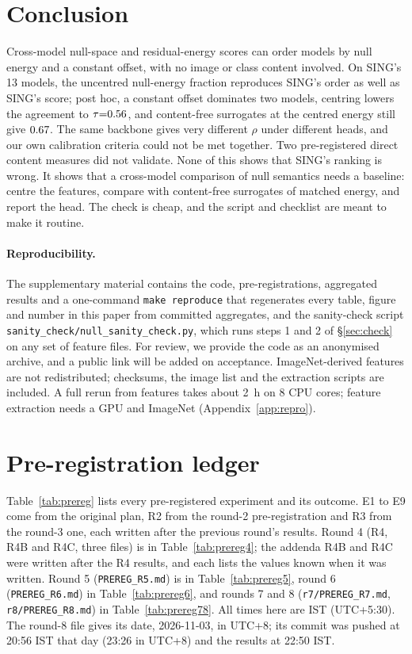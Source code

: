 \documentclass[10pt]{article}
\begin{document}
\section{Conclusion}
\label{sec:concl}
Cross-model null-space and residual-energy scores can order models by null energy and a constant offset, with no image or class content involved. On SING's 13 models, the uncentred null-energy fraction reproduces SING's order as well as SING's score; post hoc, a constant offset dominates two models, centring lowers the agreement to $\tau{=}0.56$, and content-free surrogates at the centred energy still give $0.67$. The same backbone gives very different $\rho$ under different heads, and our own calibration criteria could not be met together. Two pre-registered direct content measures did not validate. None of this shows that SING's ranking is wrong. It shows that a cross-model comparison of null semantics needs a baseline: centre the features, compare with content-free surrogates of matched energy, and report the head. The check is cheap, and the script and checklist are meant to make it routine.

\paragraph{Reproducibility.}
The supplementary material contains the code, pre-registrations, aggregated results and a one-command \texttt{make reproduce} that regenerates every table, figure and number in this paper from committed aggregates, and the sanity-check script \texttt{sanity\_check/null\_sanity\_check.py}, which runs steps 1 and 2 of \S\ref{sec:check} on any set of feature files. For review, we provide the code as an anonymised archive, and a public link will be added on acceptance.
ImageNet-derived features are not redistributed; checksums, the image list and the extraction scripts are included.
A full rerun from features takes about 2~h on 8 CPU cores; feature extraction needs a GPU and ImageNet (Appendix~\ref{app:repro}).




\appendix
\section{Pre-registration ledger}
\label{app:prereg}
Table~\ref{tab:prereg} lists every pre-registered experiment and its outcome.
E1 to E9 come from the original plan, R2 from the round-2 pre-registration and R3 from the round-3 one, each written after the previous round's results. Round 4 (R4, R4B and R4C, three files) is in Table~\ref{tab:prereg4}; the addenda R4B and R4C were written after the R4 results, and each lists the values known when it was written. Round 5 (\texttt{PREREG\_R5.md}) is in Table~\ref{tab:prereg5}, round 6 (\texttt{PREREG\_R6.md}) in Table~\ref{tab:prereg6}, and rounds 7 and 8 (\texttt{r7/PREREG\_R7.md}, \texttt{r8/PREREG\_R8.md}) in Table~\ref{tab:prereg78}. All times here are IST (UTC+5:30). The round-8 file gives its date, 2026-11-03, in UTC+8; its commit was pushed at 20:56 IST that day (23:26 in UTC+8) and the results at 22:50 IST.
\end{document}
